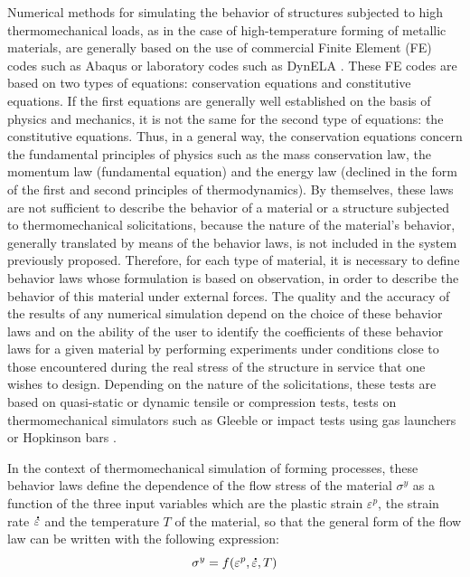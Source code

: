 \documentclass[algorithms,article,submit,pdftex,moreauthors]{Definitions/mdpi}
\DeclareRobustCommand{\mdot}[1]{\accentset{\mbox{\bfseries .}}{#1}}
\begin{document}
Numerical methods for simulating the behavior of structures subjected to high thermomechanical loads, as in the case of high-temperature forming of metallic materials, are generally based on the use of commercial Finite Element (FE) codes such as Abaqus or laboratory codes such as DynELA \cite{Pantale-2004}.
These FE codes are based on two types of equations: conservation equations and constitutive equations.
If the first equations are generally well established on the basis of physics and mechanics, it is not the same for the second type of equations: the constitutive equations.
Thus, in a general way, the conservation equations concern the fundamental principles of physics such as the mass conservation law, the momentum law (fundamental equation) and the energy law (declined in the form of the first and second principles of thermodynamics).
By themselves, these laws are not sufficient to describe the behavior of a material or a structure subjected to thermomechanical solicitations, because the nature of the material's behavior, generally translated by means of the behavior laws, is not included in the system previously proposed.
Therefore, for each type of material, it is necessary to define behavior laws whose formulation is based on observation, in order to describe the behavior of this material under external forces.
The quality and the accuracy of the results of any numerical simulation depend on the choice of these behavior laws and on the ability of the user to identify the coefficients of these behavior laws for a given material by performing experiments under conditions close to those encountered during the real stress of the structure in service that one wishes to design.
Depending on the nature of the solicitations, these tests are based on quasi-static or dynamic tensile or compression tests, tests on thermomechanical simulators such as Gleeble \cite{Lin-2009} or impact tests using gas launchers or Hopkinson bars \cite{Kolsky-1949}.

In the context of thermomechanical simulation of forming processes, these behavior laws define the dependence of the flow stress of the material $\sigma^y$ as a function of the three input variables which are the plastic strain $\varepsilon^p$, the strain rate $\mdot\varepsilon$ and the temperature $T$ of the material, so that the general form of the flow law can be written with the following expression:
\begin{equation}
\sigma^y = f\left(\varepsilon^p,\mdot\varepsilon,T\right)\label{eq:GenFlow}
\end{equation}
\end{document}

